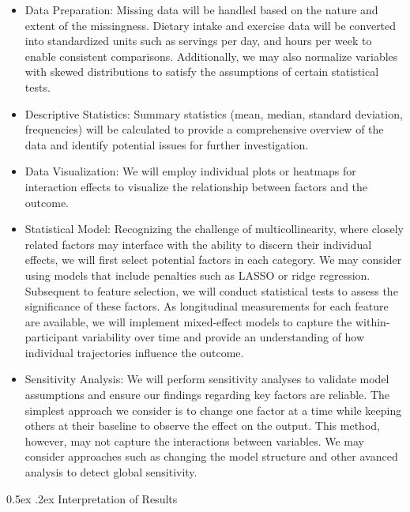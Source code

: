 \documentclass[12pt,]{article}
\makeatletter
\renewcommand\subsubsection{
  \@startsection{subsubsection}{3}{\z@}
    {-1.0ex\@plus -1ex \@minus -.2ex}%
    {0.5ex \@plus .2ex}%
    {\normalfont\normalsize\bf}} %
\makeatother
\begin{document}
\begin{itemize}
\item
  Data Preparation: Missing data will be handled based on the nature and
  extent of the missingness. Dietary intake and exercise data will be
  converted into standardized units such as servings per day, and hours
  per week to enable consistent comparisons. Additionally, we may also
  normalize variables with skewed distributions to satisfy the
  assumptions of certain statistical tests.
\item
  Descriptive Statistics: Summary statistics (mean, median, standard
  deviation, frequencies) will be calculated to provide a comprehensive
  overview of the data and identify potential issues for further
  investigation.
\item
  Data Visualization: We will employ individual plots or heatmaps for
  interaction effects to visualize the relationship between factors and
  the outcome.
\item
  Statistical Model: Recognizing the challenge of multicollinearity,
  where closely related factors may interface with the ability to
  discern their individual effects, we will first select potential
  factors in each category. We may consider using models that include
  penalties such as LASSO or ridge regression. Subsequent to feature
  selection, we will conduct statistical tests to assess the
  significance of these factors. As longitudinal measurements for each
  feature are available, we will implement mixed-effect models to
  capture the within-participant variability over time and provide an
  understanding of how individual trajectories influence the outcome.
\item
  Sensitivity Analysis: We will perform sensitivity analyses to validate
  model assumptions and ensure our findings regarding key factors are
  reliable. The simplest approach we consider is to change one factor at
  a time while keeping others at their baseline to observe the effect on
  the output. This method, however, may not capture the interactions
  between variables. We may consider approaches such as changing the
  model structure and other avanced analysis to detect global
  sensitivity.
\end{itemize}

\hypertarget{interpretation-of-results}{%
\subsubsection{Interpretation of
Results}\label{interpretation-of-results}}
\end{document}

